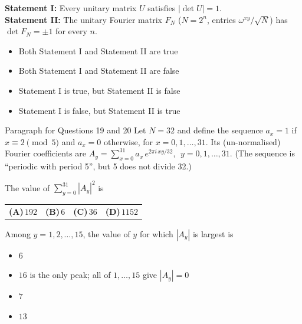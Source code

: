 \documentclass[11pt,a4paper]{article}
\newcommand{\optlabel}[1]{\textbf{(#1)}}
\newenvironment{qitem}[1]{\begin{list}{}{\setlength{\leftmargin}{3.3em}\setlength{\labelwidth}{3.1em}%
  \setlength{\labelsep}{0.2em}\setlength{\topsep}{3pt}\setlength{\parsep}{3pt}}\item[\textbf{Q.#1}\hfill]}{\end{list}}
\newcommand{\qsep}{\par\vspace{2pt}{\color{black!15}\hrule}\vspace{4pt}}
\begin{document}
\begin{qitem}{18}
\textbf{Statement I:} Every unitary matrix $U$ satisfies $|\det U| = 1$.\\[1mm]
\textbf{Statement II:} The unitary Fourier matrix $F_N$ ($N = 2^n$, entries $\omega^{xy}/\sqrt N$) has $\det F_N = \pm 1$ for every $n$.
\begin{itemize}[leftmargin=2.6em, labelsep=0.4em, itemsep=2pt, topsep=3pt]
\item[\optlabel{A}] Both Statement I and Statement II are true
\item[\optlabel{B}] Both Statement I and Statement II are false
\item[\optlabel{C}] Statement I is true, but Statement II is false
\item[\optlabel{D}] Statement I is false, but Statement II is true
\end{itemize}
\end{qitem}
\qsep

\begin{passagebox}{Paragraph for Questions 19 and 20}
Let $N = 32$ and define the sequence $a_x = 1$ if $x \equiv 2 \pmod 5$ and $a_x = 0$ otherwise, for
$x = 0, 1, \dots, 31$. Its (un-normalised) Fourier coefficients are
$A_y = \sum_{x=0}^{31} a_x\, e^{2\pi i\,xy/32}$, $\;y = 0, 1, \dots, 31$. (The sequence is ``periodic with period 5'', but
5 does not divide 32.)
\end{passagebox}
\begin{qitem}{19}
The value of $\displaystyle\sum_{y=0}^{31} |A_y|^2$ is
\par\smallskip\noindent\begin{tabularx}{\linewidth}{@{}*{4}{L}@{}}
\optlabel{A}\,$192$ & \optlabel{B}\,$6$ & \optlabel{C}\,$36$ & \optlabel{D}\,$1152$
\end{tabularx}
\end{qitem}
\qsep

\begin{qitem}{20}
Among $y = 1, 2, \dots, 15$, the value of $y$ for which $|A_y|$ is largest is
\begin{itemize}[leftmargin=2.6em, labelsep=0.4em, itemsep=2pt, topsep=3pt]
\item[\optlabel{A}] $6$
\item[\optlabel{B}] $16$ is the only peak; all of $1,\dots,15$ give $|A_y| = 0$
\item[\optlabel{C}] $7$
\item[\optlabel{D}] $13$
\end{itemize}
\end{qitem}
\qsep
\end{document}
